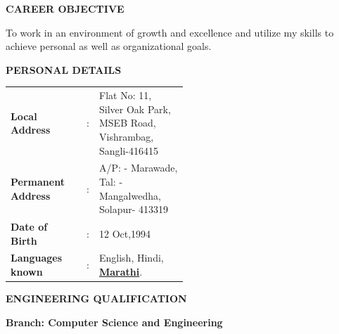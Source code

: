 \documentclass{article}
\begin{document}
\vspace{1cm}
\begin{framed}
	\large{\textbf{CAREER OBJECTIVE}}
\end{framed}
	\large{\textup{To work in an environment of growth and excellence and utilize my skills to achieve personal as well as organizational goals.}}


\vspace{1cm}
\begin{framed}
	\large{\textbf{PERSONAL DETAILS}}
\end{framed}
\def\arraystretch{1.5}
\begin{tabular}{lcm{0.5\linewidth}}
	\textbf{Local Address} & : & Flat No: 11, Silver Oak Park, MSEB Road, Vishrambag, Sangli-416415\\
	\textbf{Permanent Address} & : & A/P: - Marawade, Tal: - Mangalwedha, Solapur- 413319\\
	\textbf{Date of Birth} & : & 12 Oct,1994\\
	\textbf{Languages known} & : &  English, Hindi, \underline{\textbf{Marathi}}.
\end{tabular}

\vspace{1cm}

\begin{framed}
	\large{\textbf{ENGINEERING QUALIFICATION}}
\end{framed}
\large{\textbf{Branch: Computer Science and Engineering}}
\end{document}

